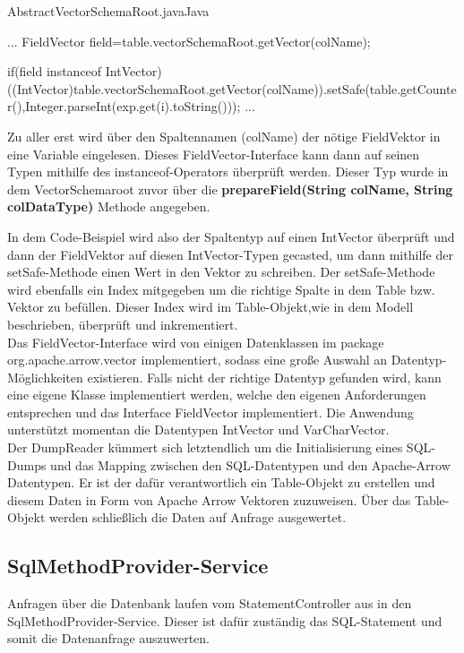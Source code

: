 \begin{codeblock}{AbstractVectorSchemaRoot.java}{Java}
  \begin{javacode}
    ...
    FieldVector field=table.vectorSchemaRoot.getVector(colName);

    if(field instanceof IntVector){
      ((IntVector)table.vectorSchemaRoot.getVector(colName)).setSafe(table.getCounter(),Integer.parseInt(exp.get(i).toString()));
	}    
    ...
  \end{javacode}
\end{codeblock}

Zu aller erst wird über den Spaltennamen (colName) der nötige FieldVektor in eine Variable eingelesen. Dieses FieldVector-Interface kann dann auf seinen Typen mithilfe des instanceof-Operators überprüft werden. Dieser Typ wurde in dem VectorSchemaroot zuvor über die \textbf{prepareField(String colName, String colDataType)} Methode angegeben.


In dem Code-Beispiel wird also der Spaltentyp auf einen IntVector überprüft und dann der FieldVektor auf diesen IntVector-Typen gecasted, um dann mithilfe der setSafe-Methode einen Wert in den Vektor zu schreiben.
Der setSafe-Methode wird ebenfalls ein Index mitgegeben um  die richtige Spalte in dem Table bzw. Vektor zu befüllen. Dieser Index wird im Table-Objekt,wie in dem Modell beschrieben, überprüft und inkrementiert.
\\
Das FieldVector-Interface wird von einigen Datenklassen im package org.apache.arrow.vector implementiert, sodass eine große Auswahl an Datentyp-Möglichkeiten existieren. Falls nicht der richtige Datentyp gefunden wird, kann eine eigene Klasse implementiert werden, welche den eigenen Anforderungen entsprechen und das Interface FieldVector implementiert.
Die Anwendung unterstützt momentan die Datentypen IntVector und VarCharVector.
\\
Der DumpReader kümmert sich letztendlich um die Initialisierung eines SQL-Dumps und das Mapping zwischen den SQL-Datentypen und den Apache-Arrow Datentypen. Er ist der dafür verantwortlich ein Table-Objekt zu erstellen und diesem Daten  in Form von Apache Arrow Vektoren zuzuweisen.
Über das Table-Objekt werden schließlich die Daten auf Anfrage ausgewertet.





\subsection{SqlMethodProvider-Service}
\label{SqlMethodProvider-Service}
Anfragen über die Datenbank laufen vom StatementController aus in den SqlMethodProvider-Service. Dieser ist dafür zuständig das SQL-Statement und somit die Datenanfrage auszuwerten.

